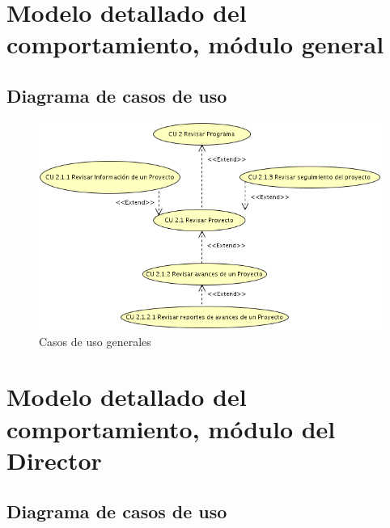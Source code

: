 \documentclass[10pt]{book}
\begin{document}

\chapter{Modelo detallado del comportamiento, módulo general} 

\section{Diagrama de casos de uso}

\begin{figure}[htbp!]
	\begin{center}
		\includegraphics[width=.8\textwidth]{images/CU/general}
		\caption{Casos de uso generales}
		\label{fig:default}
	\end{center}
\end{figure}


\chapter{Modelo detallado del comportamiento, módulo del Director} 

\section{Diagrama de casos de uso}
\end{document}
